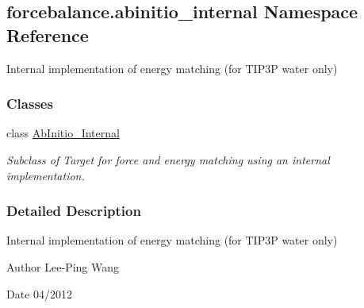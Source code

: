 \hypertarget{namespaceforcebalance_1_1abinitio__internal}{\subsection{forcebalance.\-abinitio\-\_\-internal Namespace Reference}
\label{namespaceforcebalance_1_1abinitio__internal}
}


Internal implementation of energy matching (for T\-I\-P3\-P water only)  


\subsubsection*{Classes}
\begin{DoxyCompactItemize}
\item 
class \hyperlink{classforcebalance_1_1abinitio__internal_1_1AbInitio__Internal}{Ab\-Initio\-\_\-\-Internal}
\begin{DoxyCompactList}\small\item\em Subclass of Target for force and energy matching using an internal implementation. \end{DoxyCompactList}\end{DoxyCompactItemize}


\subsubsection{Detailed Description}
Internal implementation of energy matching (for T\-I\-P3\-P water only) \begin{DoxyAuthor}{Author}
Lee-\/\-Ping Wang 
\end{DoxyAuthor}
\begin{DoxyDate}{Date}
04/2012 
\end{DoxyDate}
